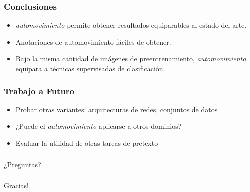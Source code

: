 \documentclass{beamer}
\begin{document}
\begin{frame}
\frametitle{Conclusiones}
\begin{itemize}
    \item \textit{automovimiento} permite obtener  resultados equiparables al estado del arte.
    \item Anotaciones de automovimiento fáciles de obtener. 
    \item Bajo la misma cantidad de imágenes de preentrenamiento, \textit{automovimiento} equipara a técnicas supervisadas de clasificación.
\end{itemize}
\end{frame}





\begin{frame}
\frametitle{Trabajo a Futuro}
\begin{itemize}
    \item Probar otras variantes: arquitecturas de redes, conjuntos de datos
    \item ¿Puede el \textit{automovimiento} aplicarse a otros dominios?
    \item Evaluar la utilidad de otras tareas de pretexto
\end{itemize}
\end{frame}





\begin{frame}
\frametitle{}
\vfill
	¿Preguntas?
\vfill
\end{frame}





\begin{frame}
\frametitle{}
\vfill
    Gracias!
\vfill
\end{frame}
\end{document}
